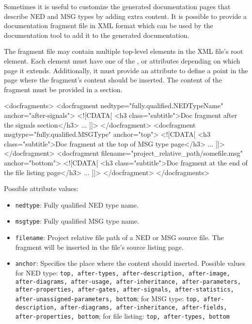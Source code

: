 Sometimes it is useful to customize the generated documentation pages that describe
NED and MSG types by adding extra content. It is possible to provide a documentation
fragment file in XML format which can be used by the documentation tool to add it to 
the generated documentation. 

The fragment file may contain multiple top-level  
elements in the XML file's root element. Each  element must
have one of the ,  or  attributes
depending on which page it extends. Additionally, it must provide an
 attribute to define a point in the page where the fragment's
content should be inserted. The content of the fragment must be provided in
a \ttt{<![CDATA[]]>} section.

\begin{xml}
<docfragments>
    <docfragment nedtype="fully.qualified.NEDTypeName" anchor="after-signals">
    <![CDATA[
        <h3 class="subtitle">Doc fragment after the signals section</h3>
        ...
    ]]>
    </docfragment>
    <docfragment msgtype="fully.qualified.MSGType" anchor="top">
    <![CDATA[
        <h3 class="subtitle">Doc fragment at the top of MSG type page</h3>
        ...
    ]]>
    </docfragment>
    <docfragment filename="project_relative_path/somefile.msg" anchor="bottom">
    <![CDATA[
        <h3 class="subtitle">Doc fragment at the end of the file listing page</h3>
        ...
    ]]>
    </docfragment>
</docfragments>
\end{xml}
    
Possible attribute values:
\begin{itemize}
    \item \texttt{nedtype}: Fully qualified NED type name. 
    \item \texttt{msgtype}: Fully qualified MSG type name.
    \item \texttt{filename}: Project relative file path of a NED or MSG source file. 
    The fragment will be inserted in the file's source listing page. 
    \item \texttt{anchor}: Specifies the place where the content should inserted.
    Possible values for NED type: \texttt{top, after-types, after-description,
    after-image, after-diagrams, after-usage, after-inheritance, after-parameters,
    after-properties, after-gates, after-signals, after-statistics, 
    after-unassigned-parameters, bottom}; for MSG type: \texttt{top, after-description,
    after-diagrams, after-inheritance, after-fields, after-properties, bottom};
    for file listing: \texttt{top, after-types, bottom}
\end{itemize}        

